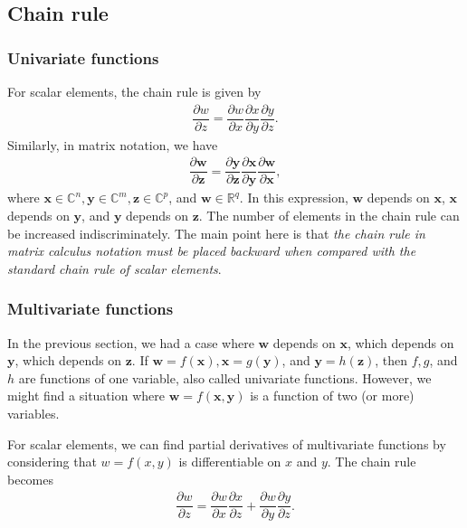 \documentclass{article}
\begin{document}
\subsection{Chain rule}
\subsubsection{Univariate functions}
For scalar elements, the chain rule is given by
\begin{align}
    \dfrac{\partial w}{\partial z} = \dfrac{\partial w}{\partial x} \dfrac{\partial x}{\partial y} \dfrac{\partial y}{\partial z}.
\end{align}
Similarly, in matrix notation, we have
\begin{align}
    \label{eq:chain-1inter}
    \dfrac{\partial \mathbf{w}}{\partial \mathbf{z}} = \dfrac{\partial \mathbf{y}}{\partial \mathbf{z}} \dfrac{\partial \mathbf{x}}{\partial \mathbf{y}} \dfrac{\partial \mathbf{w}}{\partial \mathbf{x}},
\end{align}
where \(\mathbf{x} \in \mathbb{C}^{n}, \mathbf{y} \in \mathbb{C}^{m}, \mathbf{z} \in \mathbb{C}^{p}\), and \(\mathbf{w} \in \mathbb{R}^q\). In this expression, \(\mathbf{w}\) depends on \(\mathbf{x}\), \(\mathbf{x}\) depends on \(\mathbf{y}\), and \(\mathbf{y}\) depends on \(\mathbf{z}\). The number of elements in the chain rule can be increased indiscriminately. The main point here is that \emph{the chain rule in matrix calculus notation must be placed backward when compared with the standard chain rule of scalar elements}.

\subsubsection{Multivariate functions}

In the previous section, we had a case where \(\mathbf{w}\) depends on \(\mathbf{x}\), which depends on \(\mathbf{y}\), which depends on \(\mathbf{z}\). If \(\mathbf{w} = f(\mathbf{x}), \mathbf{x} = g(\mathbf{y})\), and \(\mathbf{y} = h(\mathbf{z})\), then \(f, g\), and \(h\) are functions of one variable, also called univariate functions. However, we might find a situation where \(\mathbf{w} = f(\mathbf{x}, \mathbf{y})\) is a function of two (or more) variables.

For scalar elements, we can find partial derivatives of multivariate functions by considering that \(w = f(x, y)\) is differentiable on \(x\) and \(y\). The chain rule becomes
\begin{align}
    \dfrac{\partial w}{\partial z} = \dfrac{\partial w}{\partial x} \dfrac{\partial x}{\partial z} + \dfrac{\partial w}{\partial y} \dfrac{\partial y}{\partial z}.
\end{align}
\end{document}
